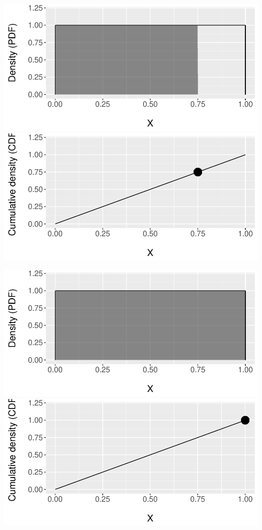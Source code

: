 \documentclass{beamer}
\begin{document}
\begin{frame}
\centering
\includegraphics[scale=.5]{figures/Unif3a.pdf} \\
\includegraphics[scale=.5]{figures/Unif3b.pdf}
\end{frame}

\begin{frame}
\centering
\includegraphics[scale=.5]{figures/Unif4a.pdf} \\
\includegraphics[scale=.5]{figures/Unif4b.pdf}
\end{frame}
\end{document}
